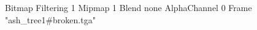 {Bitmap
	{Filtering 1}
	{Mipmap 1}
	{Blend none}
	{AlphaChannel 0}
	{Frame "ash_tree1#broken.tga"}
}
